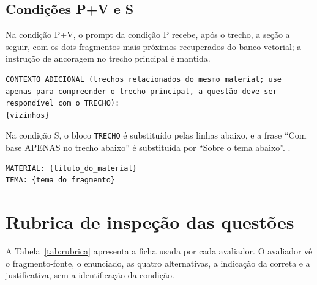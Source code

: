 \section{Condições P+V e S}

Na condição P+V, o prompt da condição P recebe, após o trecho, a seção a seguir, com os dois fragmentos mais próximos recuperados do banco vetorial; a instrução de ancoragem no trecho principal é mantida.

\begin{small}
\begin{verbatim}
CONTEXTO ADICIONAL (trechos relacionados do mesmo material; use
apenas para compreender o trecho principal, a questão deve ser
respondível com o TRECHO):
{vizinhos}
\end{verbatim}
\end{small}

Na condição S, o bloco \texttt{TRECHO} é substituído pelas linhas abaixo, e a frase ``Com base APENAS no trecho abaixo'' é substituída por ``Sobre o tema abaixo''. .

\begin{small}
\begin{verbatim}
MATERIAL: {titulo_do_material}
TEMA: {tema_do_fragmento}
\end{verbatim}
\end{small}

\chapter{\label{ap:rubrica}Rubrica de inspeção das questões}

A Tabela~\ref{tab:rubrica} apresenta a ficha usada por cada avaliador. O avaliador vê o fragmento-fonte, o enunciado, as quatro alternativas, a indicação da correta e a justificativa, sem a identificação da condição.

